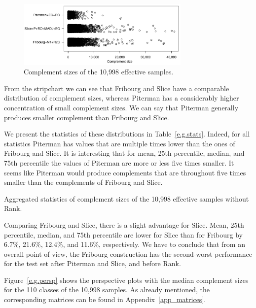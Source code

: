 \begin{figure}[ht]
\centering
\includegraphics[width=0.75\textwidth]{figures/r/external/goal/s.stripchart.pdf}
\caption{Complement sizes of the 10,998 effective samples.}
\label{e.g.stripchart}
\end{figure}

From the stripchart we can see that Fribourg and Slice have a comparable distribution of complement sizes, whereas Piterman has a considerably higher concentration of small complement sizes. We can say that Piterman generally produces smaller complement than Fribourg and Slice.

We present the statistics of these distributions in Table~\ref{e.g.stats}. 
Indeed, for all statistics Piterman has values that are multiple times lower than the ones of Fribourg and Slice. It is interesting that for mean, 25th percentile, median, and 75th percentile the values of Piterman are more or less five times smaller. It seems like Piterman would produce complements that are throughout five times smaller than the complements of Fribourg and Slice.

\begin{table}[ht]
\centering

\caption{Aggregated statistics of complement sizes of the 10,998 effective samples without Rank.}
\label{e.g.stats}
\end{table}

Comparing Fribourg and Slice, there is a slight advantage for Slice. Mean, 25th percentile, median, and 75th percentile are lower for Slice than for Fribourg by 6.7\%, 21.6\%, 12.4\%, and 11.6\%, respectively. We have to conclude that from an overall point of view, the Fribourg construction has the second-worst performance for the \goal{} test set after Piterman and Slice, and before Rank.

Figure~\ref{e.g.persp} shows the perspective plots with the median complement sizes for the 110 classes of the 10,998 samples. As already mentioned, the corresponding matrices can be found in Appendix~\ref{app_matrices}.


